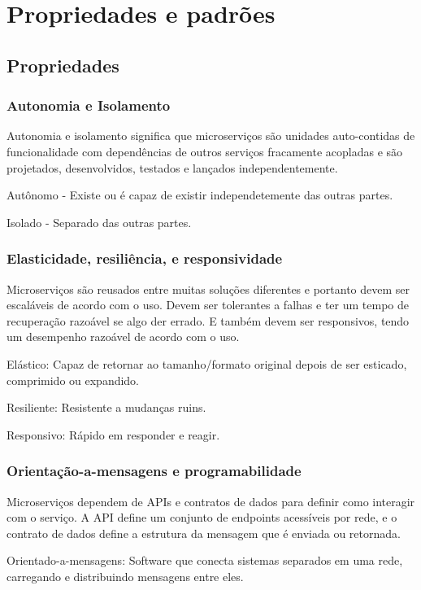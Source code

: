\chapter{Propriedades e padrões}

\section{Propriedades}

\subsection{Autonomia e Isolamento}
Autonomia e isolamento significa que microserviços são unidades auto-contidas de funcionalidade com dependências de outros serviços fracamente acopladas e são projetados, desenvolvidos, testados e lançados independentemente.

Autônomo - Existe ou é capaz de existir independetemente das outras partes.

Isolado - Separado das outras partes. 

\subsection{Elasticidade, resiliência, e responsividade}

Microserviços são reusados entre muitas soluções diferentes e portanto devem ser escaláveis de acordo com o uso. Devem ser tolerantes a falhas e ter um tempo de recuperação razoável se algo der errado. E também devem ser responsivos, tendo um desempenho razoável de acordo com o uso.

Elástico: Capaz de retornar ao tamanho/formato original depois de ser esticado, comprimido ou expandido.

Resiliente: Resistente a mudanças ruins.

Responsivo: Rápido em responder e reagir.

\subsection{Orientação-a-mensagens e programabilidade}

Microserviços dependem de APIs e contratos de dados para definir como interagir com o serviço. A API define um conjunto de endpoints acessíveis por rede, e o contrato de dados define a estrutura da mensagem que é enviada ou retornada.

Orientado-a-mensagens: Software que conecta sistemas separados em uma rede, carregando e distribuindo mensagens entre eles.

